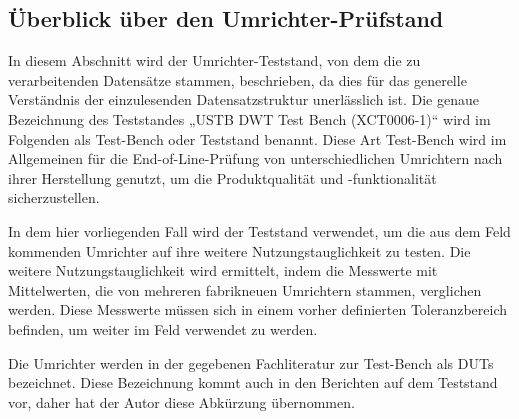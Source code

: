 
\subsection{Überblick über den Umrichter-Prüfstand}
\label{subsec:uberblick-uber-den-umrichter-prufstand}

In diesem Abschnitt wird der Umrichter-Teststand, von dem die zu verarbeitenden Datensätze stammen, beschrieben,
da dies für das generelle Verständnis der einzulesenden Datensatzstruktur unerlässlich ist.
Die genaue Bezeichnung des Teststandes „USTB DWT Test Bench (XCT0006-1)“ wird im Folgenden als Test-Bench oder Teststand benannt.
Diese Art Test-Bench wird im Allgemeinen für die End-of-Line-Prüfung von unterschiedlichen Umrichtern nach ihrer Herstellung genutzt,
um die Produktqualität und -funktionalität sicherzustellen. \cite*{Main_Manuel_USTB2018}

In dem hier vorliegenden Fall wird der Teststand verwendet, um die aus dem Feld kommenden Umrichter auf ihre weitere Nutzungstauglichkeit zu testen.
Die weitere Nutzungstauglichkeit wird ermittelt, indem die Messwerte mit Mittelwerten, die von mehreren fabrikneuen Umrichtern stammen, verglichen werden.
Diese Messwerte müssen sich in einem vorher definierten Toleranzbereich befinden, um weiter im Feld verwendet zu werden.

Die Umrichter werden in der gegebenen Fachliteratur zur Test-Bench als \ac{DUTs} bezeichnet.
Diese Bezeichnung kommt auch in den Berichten auf dem Teststand vor, daher hat der Autor diese Abkürzung übernommen.

